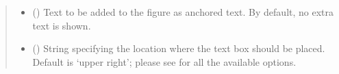 \documentclass[letterpaper,10pt,english]{sphinxmanual}
\begin{document}
\begin{fulllineitems}
\begin{quote}
\begin{description}
\begin{itemize}
\item {} 
 () \textendash{} Text to be added to the figure as anchored text. By default, no extra text is shown.

\item {} 
 () \textendash{} String specifying the location where the text box should be placed. Default is ‘upper right’;
please see  for all the available options.

\end{itemize}

\end{description}\end{quote}

\end{fulllineitems}

\end{document}
